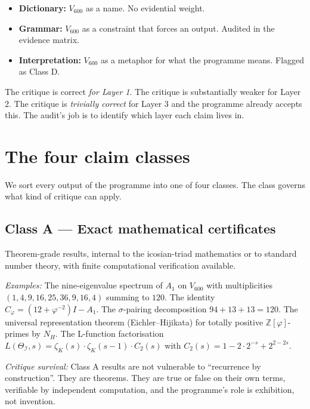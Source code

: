 \documentclass[11pt,a4paper]{article}
\newcommand{\II}{\mathcal{I}}
\newcommand{\Vsix}{V_{600}}
\newcommand{\Cphi}{C_\varphi}
\newcommand{\NH}{N_H}
\newcommand{\Z}{\mathbb{Z}}
\begin{document}
\bigskip

\begin{tcolorbox}[colback=gray!5,colframe=gray!50!black,title=The three layers]
\begin{itemize}[leftmargin=*]
  \item \textbf{Dictionary:} $\Vsix$ as a name. No evidential weight.
  \item \textbf{Grammar:} $\Vsix$ as a constraint that forces an
        output. Audited in the evidence matrix.
  \item \textbf{Interpretation:} $\Vsix$ as a metaphor for what
        the programme means. Flagged as Class D.
\end{itemize}
\end{tcolorbox}

The critique is correct \emph{for Layer 1}. The critique is
substantially weaker for Layer 2. The critique is \emph{trivially
correct} for Layer 3 and the programme already accepts this. The
audit's job is to identify which layer each claim lives in.

\section{The four claim classes}
\label{sec:classes}

We sort every output of the programme into one of four classes. The
class governs what kind of critique can apply.

\subsection{Class A --- Exact mathematical certificates}

Theorem-grade results, internal to the icosian-triad mathematics or
to standard number theory, with finite computational verification
available.

\emph{Examples:} The nine-eigenvalue spectrum of $A_1$ on $\Vsix$
with multiplicities $(1,4,9,16,25,36,9,16,4)$ summing to $120$. The
identity $\Cphi = (12+\varphi^{-2})I - A_1$. The
$\sigma$-pairing decomposition $94+13+13 = 120$. The universal
representation theorem (Eichler--Hijikata) for totally positive
$\Z[\varphi]$-primes by $\NH$. The L-function factorisation
$L(\Theta_\II, s) = \zeta_K(s) \cdot \zeta_K(s-1) \cdot C_2(s)$
with $C_2(s) = 1 - 2 \cdot 2^{-s} + 2^{2-2s}$.

\emph{Critique survival:} Class A results are not vulnerable to
``recurrence by construction''. They are theorems. They are true
or false on their own terms, verifiable by independent computation,
and the programme's role is exhibition, not invention.
\end{document}
